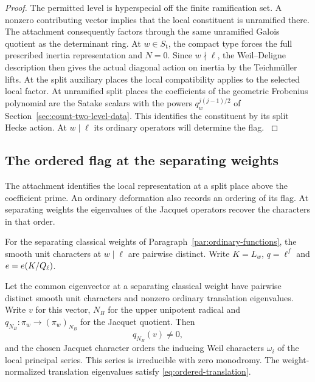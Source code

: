 \begin{proof}
The permitted level is hyperspecial off the finite ramification
set. A nonzero contributing vector implies that the local
constituent is unramified there. The attachment consequently
factors through the same unramified Galois quotient as the
determinant ring. At \(w\in S_{\mathrm t}\), the compact type
forces the full prescribed inertia representation and \(N=0\).
Since \(w\nmid\ell\), the Weil--Deligne description then gives
the actual diagonal action on inertia by the Teichmüller lifts.
At the split auxiliary places the local compatibility applies
to the selected local factor. At unramified split places the
coefficients of the geometric Frobenius polynomial are the
Satake scalars with the powers \(q_w^{j(j-1)/2}\) of
Section~\ref{sec:count-two-level-data}. This identifies the constituent by its split Hecke action. At \(w\mid\ell\) its ordinary operators will determine the flag. \label{cor:ordinary-level-attachments-1}

\end{proof}

\subsection{The ordered flag at the separating weights}

The attachment identifies the local representation at a split place above the coefficient prime. An ordinary deformation also records an ordering of its flag. At separating weights the eigenvalues of the Jacquet operators recover the characters in that order.

For the separating classical weights of
Paragraph~\ref{par:ordinary-functions}, the smooth unit
characters at \(w\mid\ell\) are pairwise distinct. Write
\(K=L_w\), \(q=\ell^f\) and \(e=e(K/Q_\ell)\).

\begin{lemma}\label{lem:ordinary-jacquet-reading}
Let the common eigenvector at a separating classical weight
have pairwise distinct smooth unit characters and nonzero
ordinary translation eigenvalues. Write \(v\) for this vector, \(N_B\) for the upper unipotent radical and \(q_{N_B}:\pi_w\to(\pi_w)_{N_B}\) for the Jacquet quotient. Then
\[
 q_{N_B}(v)\ne0,
\]
and the chosen Jacquet character orders the inducing
Weil characters \(\omega_i\) of the local principal series.
This series is irreducible with zero monodromy. The
weight-normalized translation eigenvalues satisfy
\eqref{eq:ordered-translation}.
\end{lemma}

